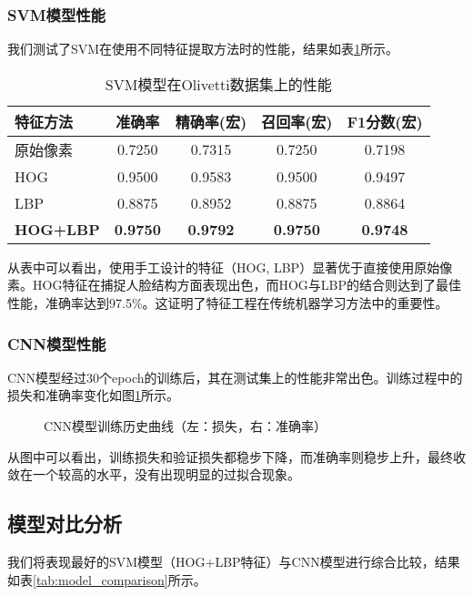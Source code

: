 \documentclass[a4paper]{article}
\begin{document}
\subsubsection{SVM模型性能}
我们测试了SVM在使用不同特征提取方法时的性能，结果如表\ref{tab:svm_results}所示。

\begin{table}[H]
    \centering
    \caption{SVM模型在Olivetti数据集上的性能}
    \label{tab:svm_results}
    \begin{tabular}{@{}lcccc@{}}
        \toprule
        特征方法 & 准确率 & 精确率(宏) & 召回率(宏) & F1分数(宏) \\
        \midrule
        原始像素 & 0.7250 & 0.7315 & 0.7250 & 0.7198 \\
        HOG & 0.9500 & 0.9583 & 0.9500 & 0.9497 \\
        LBP & 0.8875 & 0.8952 & 0.8875 & 0.8864 \\
        \textbf{HOG+LBP} & \textbf{0.9750} & \textbf{0.9792} & \textbf{0.9750} & \textbf{0.9748} \\
        \bottomrule
    \end{tabular}
\end{table}

从表中可以看出，使用手工设计的特征（HOG, LBP）显著优于直接使用原始像素。HOG特征在捕捉人脸结构方面表现出色，而HOG与LBP的结合则达到了最佳性能，准确率达到97.5\%。这证明了特征工程在传统机器学习方法中的重要性。

\subsubsection{CNN模型性能}
CNN模型经过30个epoch的训练后，其在测试集上的性能非常出色。训练过程中的损失和准确率变化如图\ref{fig:cnn_history}所示。

\begin{figure}[H]
    \centering
    \caption{CNN模型训练历史曲线（左：损失，右：准确率）}
    \label{fig:cnn_history}
\end{figure}

从图中可以看出，训练损失和验证损失都稳步下降，而准确率则稳步上升，最终收敛在一个较高的水平，没有出现明显的过拟合现象。

\subsection{模型对比分析}
我们将表现最好的SVM模型（HOG+LBP特征）与CNN模型进行综合比较，结果如表\ref{tab:model_comparison}所示。
\end{document}
